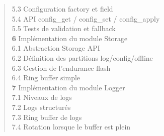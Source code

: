 \begin{quote}
\hspace{2.5em} 5.3 \hspace{0.5em} Configuration factory et field \dotfill \pageref{subsec:config_ff}\\
\hspace{2.5em} 5.4 \hspace{0.5em} API config\_get / config\_set / config\_apply \dotfill \pageref{subsec:config_api}\\
\hspace{2.5em} 5.5 \hspace{0.5em} Tests de validation et fallback \dotfill \pageref{subsec:config_tests}\\
\textbf{6} \hspace{1em} Implémentation du module Storage \dotfill \pageref{sec:storage_impl}\\
\hspace{2.5em} 6.1 \hspace{0.5em} Abstraction Storage API \dotfill \pageref{subsec:storage_api}\\
\hspace{2.5em} 6.2 \hspace{0.5em} Définition des partitions log/config/offline \dotfill \pageref{subsec:storage_parts}\\
\hspace{2.5em} 6.3 \hspace{0.5em} Gestion de l'endurance flash \dotfill \pageref{subsec:storage_endur}\\
\hspace{2.5em} 6.4 \hspace{0.5em} Ring buffer simple \dotfill \pageref{subsec:ringbuf}\\
\textbf{7} \hspace{1em} Implémentation du module Logger \dotfill \pageref{sec:logger_impl}\\
\hspace{2.5em} 7.1 \hspace{0.5em} Niveaux de logs \dotfill \pageref{subsec:loglevels}\\
\hspace{2.5em} 7.2 \hspace{0.5em} Logs structurés \dotfill \pageref{subsec:logstruct}\\
\hspace{2.5em} 7.3 \hspace{0.5em} Ring buffer de logs \dotfill \pageref{subsec:logring}\\
\hspace{2.5em} 7.4 \hspace{0.5em} Rotation lorsque le buffer est plein \dotfill \pageref{subsec:logrot}\\

\end{quote}
